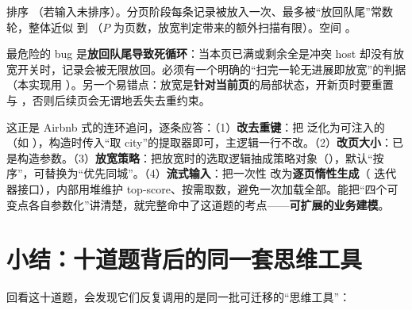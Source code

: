 \begin{keypoint}[复杂度]
排序 （若输入未排序）。分页阶段每条记录被放入一次、最多被“放回队尾”常数轮，整体近似  到 （$P$ 为页数，放宽判定带来的额外扫描有限）。空间 。
\end{keypoint}

\begin{pitfall}[放宽时机与死循环]
最危险的 bug 是\textbf{放回队尾导致死循环}：当本页已满或剩余全是冲突 host 却没有放宽开关时，记录会被无限放回。必须有一个明确的“扫完一轮无进展即放宽”的判据（本实现用 ）。另一个易错点：放宽是\textbf{针对当前页}的局部状态，开新页时要重置  与 ，否则后续页会无谓地丢失去重约束。
\end{pitfall}

\begin{followup}
这正是 Airbnb 式的连环追问，逐条应答：（1）\textbf{改去重键}：把  泛化为可注入的 （如 ），构造时传入“取 city”的提取器即可，主逻辑一行不改。（2）\textbf{改页大小}：已是构造参数。（3）\textbf{放宽策略}：把放宽时的选取逻辑抽成策略对象（），默认“按序”，可替换为“优先同城”。（4）\textbf{流式输入}：把一次性  改为\textbf{逐页惰性生成}（ 迭代器接口），内部用堆维护 top-score、按需取数，避免一次加载全部。能把“四个可变点各自参数化”讲清楚，就完整命中了这道题的考点——\textbf{可扩展的业务建模}。
\end{followup}

\section{小结：十道题背后的同一套思维工具}

回看这十道题，会发现它们反复调用的是同一批可迁移的“思维工具”：

